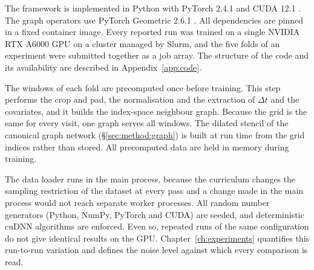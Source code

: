 The framework is implemented in Python with PyTorch 2.4.1 and CUDA 12.1
\citep{Paszke2019}. The graph operators use PyTorch Geometric 2.6.1
\citep{Fey2019}.
All dependencies are pinned in a fixed container image. Every reported run
was trained on a single NVIDIA RTX A6000 GPU on a cluster managed by
Slurm, and the five folds of an experiment were submitted together as a job
array. The structure of the code and its availability are described in
Appendix~\ref{app:code}.

The windows of each fold are precomputed once before training. This step
performs the crop and pad, the normalisation and the extraction of
$\Delta t$ and the covariates, and it builds the index-space neighbour
graph. Because the grid is the same for every visit, one graph serves all
windows. The dilated stencil of the canonical graph network
(\S\ref{sec:method:graph}) is built at run time from the grid indices
rather than stored. All precomputed data are held in memory during
training.

The data loader runs in the main process, because the curriculum changes
the sampling restriction of the dataset at every pass and a change made in
the main process would not reach separate worker processes. All random
number generators (Python, NumPy, PyTorch and CUDA) are seeded, and
deterministic cuDNN algorithms are enforced. Even so, repeated runs of the
same configuration do not give identical results on the GPU.
Chapter~\ref{ch:experiments} quantifies this run-to-run variation and
defines the noise level against which every comparison is read.


